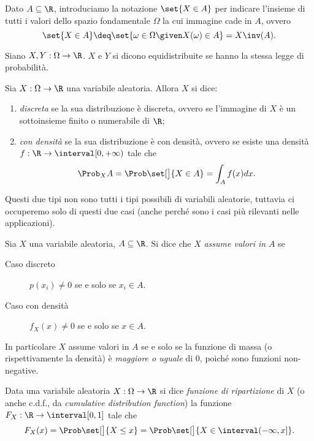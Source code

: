Dato $A \subseteq \R$, introduciamo la notazione $\set{X \in A}$ per indicare l'insieme di tutti i valori dello spazio fondamentale $\Omega$ la cui immagine cade in $A$, ovvero \[
    \set{X \in A} \deq \set{\omega \in \Omega \given X(\omega) \in A} = X\inv(A).    
\] 

\begin{definition}
     Siano $X, Y : \Omega \to \R$. $X$ e $Y$ si dicono equidistribuite se hanno la stessa legge di probabilità.
\end{definition}

\begin{definition}
     Sia $X : \Omega \to \R$ una variabile aleatoria. Allora $X$ si dice: \begin{enumerate}
        \item \emph{discreta} se la sua distribuzione è discreta, ovvero se l'immagine di $X$ è un sottoinsieme finito o numerabile di $\R$;
        \item \emph{con densità} se la sua distribuzione è con densità, ovvero se esiste una densità $f : \R \to \interval[{0, +\infty})$ tale che \[
            \Prob_{X}{A} = \Prob\set[\big]{X \in A} = \int_A f(x)dx.    
        \]
    \end{enumerate}
\end{definition}

Questi due tipi non sono tutti i tipi possibili di variabili aleatorie, tuttavia ci occuperemo solo di questi due casi (anche perché sono i casi più rilevanti nelle applicazioni).

\begin{definition}
    Sia $X$ una variabile aleatoria, $A \subseteq \R$. Si dice che $X$ \emph{assume valori in} $A$ se
    \begin{description}
        \item[Caso discreto] $p(x_i) \neq 0$ se e solo se $x_i \in A$.
        \item[Caso con densità] $f_X(x) \neq 0$ se e solo se $x \in A$. 
    \end{description}
\end{definition}

In particolare $X$ assume valori in $A$ se e solo se la funzione di massa (o rispettivamente la densità) è \emph{maggiore o uguale} di $0$, poiché sono funzioni non-negative.

\begin{definition}
    Data una variabile aleatoria $X : \Omega \to \R$ si dice \emph{funzione di ripartizione} di $X$ (o anche c.d.f., da \emph{cumulative distribution function}) la funzione $F_{X} : \R \to \interval[{0,1}]$ tale che \[
        F_{X}(x) = \Prob\set[\big]{X \leq x} = \Prob\set[\big]{X \in \interval({-\infty, x}]}.   
    \]
\end{definition}

